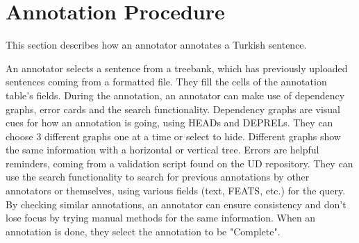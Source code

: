 \section{Annotation Procedure}
\label{sec:annotation}
This section describes how an annotator annotates a Turkish sentence.

An annotator selects a sentence from a treebank, which has previously uploaded sentences coming from a \conllu{} formatted file.
They fill the cells of the annotation table's fields.
During the annotation, an annotator can make use of dependency graphs, error cards and the search functionality.
Dependency graphs are visual cues for how an annotation is going, using HEADs and DEPRELs.
They can choose 3 different graphs one at a time or select to hide.
Different graphs show the same information with a horizontal or vertical tree.
Errors are helpful reminders, coming from a validation script found on the UD repository.
They can use the search functionality to search for previous annotations by other annotators or themselves, using various fields (text, FEATS, etc.) for the query.
By checking similar annotations, an annotator can ensure consistency and don't lose focus by trying manual methods for the same information.
When an annotation is done, they select the annotation to be "Complete".
